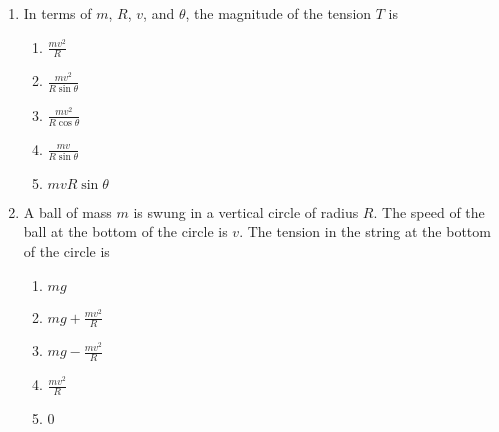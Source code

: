 \documentclass{../../../oss-classkick}
\begin{document}
\begin{multicols*}{2}
\begin{enumerate}[leftmargin=18pt,resume]
\begin{enumerate}[nosep,leftmargin=18pt,label=(\Alph*)]
    \item{}
      
    \item{}
    \end{enumerate}
    \label{ball1}

  \item In terms of $m$, $R$, $v$, and $\theta$, the magnitude of the tension
    $T$ is
    \begin{enumerate}[nosep,leftmargin=18pt,label=(\Alph*)]
    \item $\displaystyle\frac{mv^2}R$
    \item $\displaystyle\frac{mv^2}{R\sin\theta}$
    \item $\displaystyle\frac{mv^2}{R\cos\theta}$
    \item $\displaystyle\frac{mv}{R\sin\theta}$
    \item $mvR\sin\theta$
    \end{enumerate}
    \label{ball2}
    \columnbreak
    
  \item A ball of mass $m$ is swung in a vertical circle of radius $R$. The
    speed of the ball at the bottom of the circle is $v$. The tension in the
    string at the bottom of the circle is
    \begin{enumerate}[nosep,leftmargin=18pt,label=(\Alph*)]
    \item $mg$
    \item $\displaystyle mg+\frac{mv^2}{R}$
    \item $\displaystyle mg-\frac{mv^2}{R}$
    \item $\displaystyle \frac{mv^2}{R}$
    \item 0
    \end{enumerate}
    

\end{enumerate}
\end{multicols*}
\end{document}
